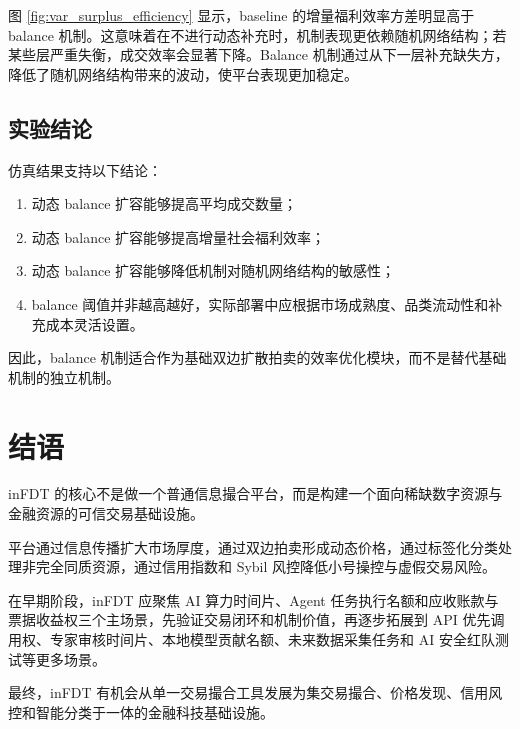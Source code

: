 \documentclass[UTF8,a4paper,12pt]{ctexart}
\begin{document}
图 \ref{fig:var_surplus_efficiency} 显示，baseline 的增量福利效率方差明显高于 balance 机制。这意味着在不进行动态补充时，机制表现更依赖随机网络结构；若某些层严重失衡，成交效率会显著下降。Balance 机制通过从下一层补充缺失方，降低了随机网络结构带来的波动，使平台表现更加稳定。

\subsection{实验结论}

仿真结果支持以下结论：

\begin{enumerate}
    \item 动态 balance 扩容能够提高平均成交数量；
    \item 动态 balance 扩容能够提高增量社会福利效率；
    \item 动态 balance 扩容能够降低机制对随机网络结构的敏感性；
    \item balance 阈值并非越高越好，实际部署中应根据市场成熟度、品类流动性和补充成本灵活设置。
\end{enumerate}

因此，balance 机制适合作为基础双边扩散拍卖的效率优化模块，而不是替代基础机制的独立机制。

\section*{结语}

inFDT 的核心不是做一个普通信息撮合平台，而是构建一个面向稀缺数字资源与金融资源的可信交易基础设施。

平台通过信息传播扩大市场厚度，通过双边拍卖形成动态价格，通过标签化分类处理非完全同质资源，通过信用指数和 Sybil 风控降低小号操控与虚假交易风险。

在早期阶段，inFDT 应聚焦 AI 算力时间片、Agent 任务执行名额和应收账款与票据收益权三个主场景，先验证交易闭环和机制价值，再逐步拓展到 API 优先调用权、专家审核时间片、本地模型贡献名额、未来数据采集任务和 AI 安全红队测试等更多场景。

最终，inFDT 有机会从单一交易撮合工具发展为集交易撮合、价格发现、信用风控和智能分类于一体的金融科技基础设施。
\end{document}
